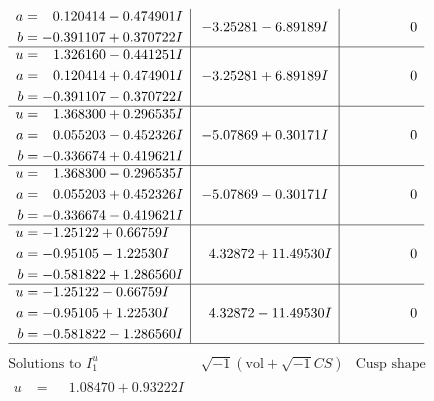 \documentclass[1p]{elsarticle_modified}
\theoremstyle{definition}
\newcommand{\I}{\sqrt{-1}}
\begin{document}
$$\begin{array}{c|c|c}
\begin{aligned}
a &= \phantom{-}0.120414 - 0.474901 I \\
b &= -0.391107 + 0.370722 I\end{aligned}
 & -3.25281 - 6.89189 I & \phantom{-0.000000 } 0 \\ \hline\begin{aligned}
u &= \phantom{-}1.326160 - 0.441251 I \\
a &= \phantom{-}0.120414 + 0.474901 I \\
b &= -0.391107 - 0.370722 I\end{aligned}
 & -3.25281 + 6.89189 I & \phantom{-0.000000 } 0 \\ \hline\begin{aligned}
u &= \phantom{-}1.368300 + 0.296535 I \\
a &= \phantom{-}0.055203 - 0.452326 I \\
b &= -0.336674 + 0.419621 I\end{aligned}
 & -5.07869 + 0.30171 I & \phantom{-0.000000 } 0 \\ \hline\begin{aligned}
u &= \phantom{-}1.368300 - 0.296535 I \\
a &= \phantom{-}0.055203 + 0.452326 I \\
b &= -0.336674 - 0.419621 I\end{aligned}
 & -5.07869 - 0.30171 I & \phantom{-0.000000 } 0 \\ \hline\begin{aligned}
u &= -1.25122 + 0.66759 I \\
a &= -0.95105 - 1.22530 I \\
b &= -0.581822 + 1.286560 I\end{aligned}
 & \phantom{-}4.32872 + 11.49530 I & \phantom{-0.000000 } 0 \\ \hline\begin{aligned}
u &= -1.25122 - 0.66759 I \\
a &= -0.95105 + 1.22530 I \\
b &= -0.581822 - 1.286560 I\end{aligned}
 & \phantom{-}4.32872 - 11.49530 I & \phantom{-0.000000 } 0\\
 \hline 
 \end{array}$$\newpage$$\begin{array}{c|c|c}  
\text{Solutions to }I^u_{1}& \I (\text{vol} + \sqrt{-1}CS) & \text{Cusp shape}\\
 \hline 
\begin{aligned}
u &= \phantom{-}1.08470 + 0.93222 I \\

\end{aligned}
\end{array}$$
\end{document}
